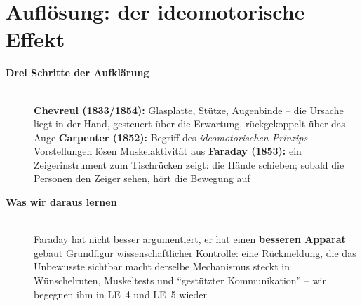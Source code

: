 \section{Auflösung: der ideomotorische Effekt}
\begin{description}
\item[{\rot\bf Drei Schritte der Aufklärung}]~\\[-\lblskip]
\bi
  \ite \textbf{Chevreul (1833/1854):} Glasplatte, Stütze, Augenbinde --
    die Ursache liegt in der Hand, gesteuert über die Erwartung, rückgekoppelt
    über das Auge \parencite{chevreul1854}
  \ite \textbf{Carpenter (1852):} Begriff des \emph{ideomotorischen
    Prinzips} -- Vorstellungen lösen Muskelaktivität aus
    \parencite{carpenter1852}
  \ite \textbf{Faraday (1853):} ein Zeigerinstrument zum Tischrücken zeigt:
    die Hände schieben; sobald die Personen den Zeiger sehen, hört die
    Bewegung auf \parencite{faraday1853}
\ei
\os{\newpage}

\item[{\rot\bf Was wir daraus lernen}]~\\[-\lblskip]
\bi
  \ite Faraday hat nicht besser argumentiert, er hat einen \textbf{besseren
    Apparat} gebaut
  \ite Grundfigur wissenschaftlicher Kontrolle: eine Rückmeldung, die das
    Unbewusste sichtbar macht
  \ite derselbe Mechanismus steckt in Wünschelruten, Muskeltests und
    \enquote{gestützter Kommunikation} -- wir begegnen ihm in LE~4 und LE~5
    wieder
\ei
\os{\newpage}
\end{description}

